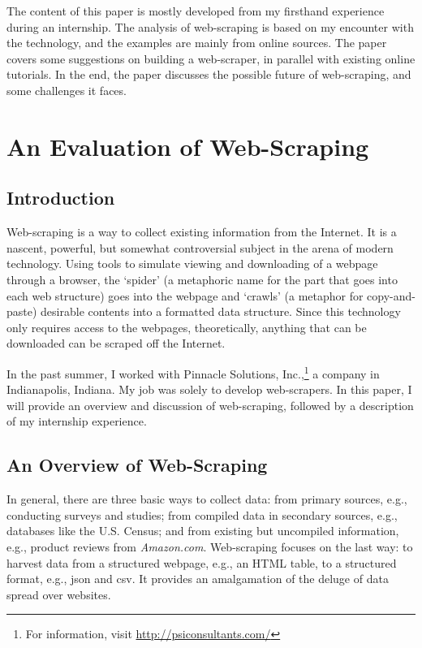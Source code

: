 \documentclass[12pt,twoside,draft]{report}
\begin{document}
The content of this paper is mostly developed from my firsthand experience during an internship. The analysis of web-scraping is based on my encounter with the technology, and the examples are mainly from online sources. The paper covers some suggestions on building a web-scraper, in parallel with existing online tutorials. In the end, the paper discusses the possible future of web-scraping, and some challenges it faces. 

\cleardoublepage

\tableofcontents
\listoffigures

\cleardoublepage

\chapter{An Evaluation of Web-Scraping}
\section*{Introduction}
Web-scraping is a way to collect existing information from the Internet. It is a nascent, powerful, but somewhat controversial subject in the arena of modern technology. Using tools to simulate viewing and downloading of a webpage through a browser, the `spider' (a metaphoric name for the part that goes into each web structure) goes into the webpage and `crawls' (a metaphor for copy-and-paste) desirable contents into a formatted data structure. Since this technology only requires access to the webpages, theoretically, anything that can be downloaded can be scraped off the Internet.

In the past summer, I worked with Pinnacle Solutions, Inc.,\footnote{For information, visit \url{http://psiconsultants.com/}} a company in Indianapolis, Indiana. My job was solely to develop web-scrapers. In this paper, I will provide an overview and discussion of web-scraping, followed by a description of my internship experience.

\section{An Overview of Web-Scraping}
In general, there are three basic ways to collect data: from primary sources, e.g., conducting surveys and studies; from compiled data in secondary sources, e.g., databases like the U.S. Census; and from existing but uncompiled information, e.g., product reviews from \textit{Amazon.com}. Web-scraping focuses on the last way: to \gls{harvest} data from a structured webpage, e.g., an HTML table, to a structured format, e.g., \gls{json} and \gls{csv}. It provides an amalgamation of the deluge of data spread over websites.
\end{document}
